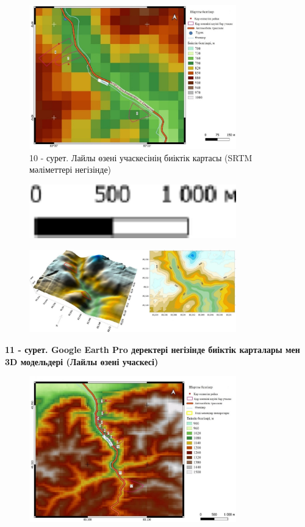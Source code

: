 \begin{figure}[H]
	\centering
	\includegraphics[width=0.8\textwidth]{media/ict2/image213}
	\caption*{10 - сурет. Лайлы өзені учаскесінің биіктік картасы (SRTM мәліметтері негізінде)}
\end{figure}

\begin{figure}[H]
	\centering
	\includegraphics[width=0.8\textwidth]{media/ict2/image209}
	\caption*{}
\end{figure}

\begin{figure}[H]
	\centering
	\includegraphics[width=0.8\textwidth]{media/ict2/image214}
	\caption*{}
\end{figure}

{\bfseries 11 - сурет. Google Earth Pro деректері негізінде биіктік карталары мен 3D модельдері (Лайлы өзені учаскесі)}

\begin{figure}[H]
	\centering
	\includegraphics[width=0.8\textwidth]{media/ict2/image215}
	\caption*{}
\end{figure}

